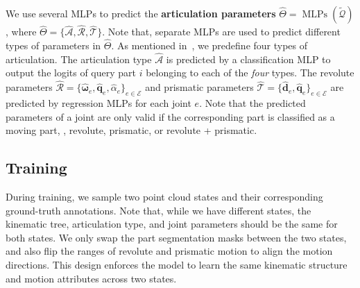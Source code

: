 We use several MLPs to predict the \textbf{articulation parameters} $\hat{\Theta} =\operatorname{MLPs} (\tilde{\mathcal{Q}})$,
where $\hat{\Theta} = \{\hat{\mathcal{A}}, \hat{\mathcal{R}}, \hat{\mathcal{T}}\}$.
Note that,
separate MLPs are used to predict different types of parameters in $\hat{\Theta}$.
As mentioned in~,
we predefine four types of articulation.
The articulation type $\hat{\mathcal{A}}$ is predicted by a classification MLP to output the logits of query part $i$ belonging to each of the \emph{four} types.
The revolute parameters $\hat{\mathcal{R}} = \{\hat{\bm{\omega}}_e, \hat{\bm{q}}_e, \hat{\alpha}_e\}_{e\in\mathcal{E}}$
and prismatic parameters $\hat{\mathcal{T}} = \{\hat{\bm{d}}_e, \hat{\bm{q}}_e\}_{e\in\mathcal{E}}$ are predicted by regression MLPs for each joint $e$.
Note that the predicted parameters of a joint are only valid if the corresponding part is classified as a moving part, \ie, revolute, prismatic, or revolute + prismatic.


\subsection{Training}
\label{sec:training}

During training, we sample two point cloud states and their corresponding ground-truth annotations.
Note that,
while we have different states,
the kinematic tree, articulation type, and joint parameters should be the same for both states.
We only swap the part segmentation masks between the two states, and also flip the ranges of revolute and prismatic motion to align the motion directions.
This design enforces the model to learn the same kinematic structure and motion attributes across two states.


